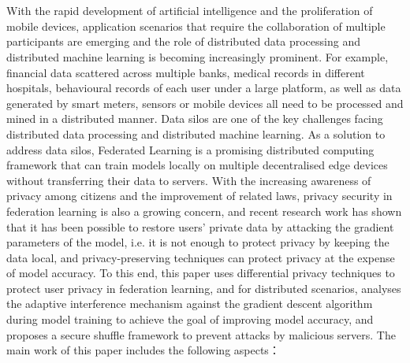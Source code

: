\newpage
\vspace{-1cm}
\chapter*{}

With the rapid development of artificial intelligence and the proliferation of mobile devices, application scenarios that require the collaboration of multiple participants are emerging and the role of distributed data processing and distributed machine learning is becoming increasingly prominent. For example, financial data scattered across multiple banks, medical records in different hospitals, behavioural records of each user under a large platform, as well as data generated by smart meters, sensors or mobile devices all need to be processed and mined in a distributed manner. Data silos are one of the key challenges facing distributed data processing and distributed machine learning. As a solution to address data silos, Federated Learning is a promising distributed computing framework that can train models locally on multiple decentralised edge devices without transferring their data to servers. With the increasing awareness of privacy among citizens and the improvement of related laws, privacy security in federation learning is also a growing concern, and recent research work has shown that it has been possible to restore users' private data by attacking the gradient parameters of the model, i.e. it is not enough to protect privacy by keeping the data local, and privacy-preserving techniques can protect privacy at the expense of model accuracy. To this end, this paper uses differential privacy techniques to protect user privacy in federation learning, and for distributed scenarios, analyses the adaptive interference mechanism against the gradient descent algorithm during model training to achieve the goal of improving model accuracy, and proposes a secure shuffle framework to prevent attacks by malicious servers. The main work of this paper includes the following aspects：
